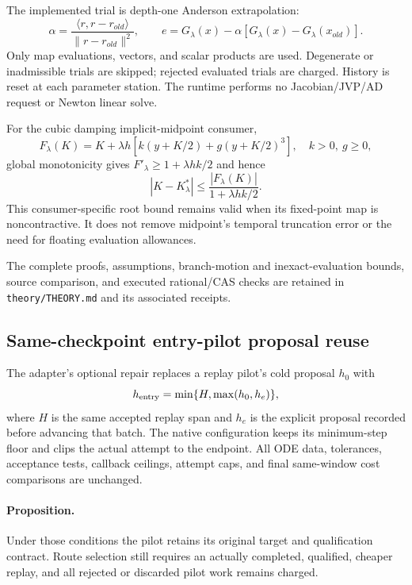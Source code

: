 The implemented trial is depth-one Anderson extrapolation:
\begin{equation}
 \alpha=\frac{\langle r,r-r_{old}\rangle}{\|r-r_{old}\|^2},\qquad
 e=G_\lambda(x)-\alpha[G_\lambda(x)-G_\lambda(x_{old})].
\end{equation}
Only map evaluations, vectors, and scalar products are used. Degenerate or
inadmissible trials are skipped; rejected evaluated trials are charged.
History is reset at each parameter station. The runtime performs no
Jacobian/JVP/AD request or Newton linear solve.

For the cubic damping implicit-midpoint consumer,
\begin{equation}
 F_\lambda(K)=K+\lambda h[k(y+K/2)+g(y+K/2)^3],
 \quad k>0,\ g\ge0,
\end{equation}
global monotonicity gives $F'_\lambda\ge1+\lambda hk/2$ and hence
\begin{equation}
 |K-K^*_{\lambda}|\le
 \frac{|F_\lambda(K)|}{1+\lambda hk/2}.
\end{equation}
This consumer-specific root bound remains valid when its fixed-point map
is noncontractive. It does not remove midpoint's temporal truncation
error or the need for floating evaluation allowances.

The complete proofs, assumptions, branch-motion and inexact-evaluation
bounds, source comparison, and executed rational/CAS checks are retained
in \texttt{theory/THEORY.md} and its associated receipts.

\subsection{Same-checkpoint entry-pilot proposal reuse}

The adapter's optional repair replaces a replay pilot's cold proposal $h_0$
with
\begin{equation}
 h_{\rm entry}=\min\{H,\max(h_0,h_e)\},
\end{equation}
where $H$ is the same accepted replay span
and $h_e$ is the explicit proposal recorded before advancing that batch.
The native configuration keeps its minimum-step floor and clips the actual
attempt to the endpoint. All ODE data, tolerances, acceptance tests, callback
ceilings, attempt caps, and final same-window cost comparisons are unchanged.

\paragraph{Proposition.}
Under those conditions the pilot retains its original target and
qualification contract. Route selection still requires an actually
completed, qualified, cheaper replay, and all rejected or discarded pilot
work remains charged.

